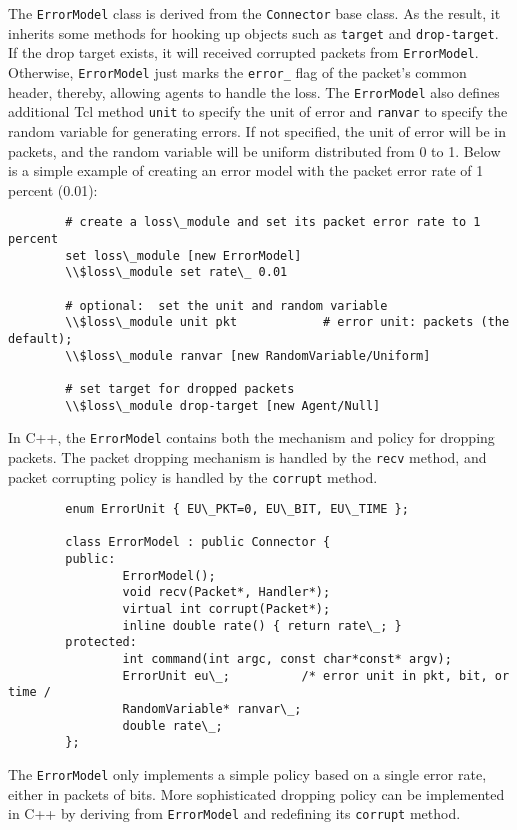 The {\tt ErrorModel} class is derived from the {\tt Connector} base
class.  As the result, it inherits some methods for hooking up objects
such as {\tt target} and {\tt drop-target}.  If the drop target
exists, it will received corrupted packets from {\tt ErrorModel}.
Otherwise, {\tt ErrorModel} just marks the {\tt error\_} flag of the
packet's common header, thereby, allowing agents to handle the loss.
The {\tt ErrorModel} also defines additional Tcl method {\tt unit} to
specify the unit of error and {\tt ranvar} to specify the random
variable for generating errors.  If not specified, the unit of error
will be in packets, and the random variable will be uniform distributed
from 0 to 1.  Below is a simple example of creating an error model with
the packet error rate of 1 percent (0.01):
\begin{verbatim}
        # create a loss\_module and set its packet error rate to 1 percent
        set loss\_module [new ErrorModel]
        \\$loss\_module set rate\_ 0.01

        # optional:  set the unit and random variable
        \\$loss\_module unit pkt            # error unit: packets (the default);
        \\$loss\_module ranvar [new RandomVariable/Uniform]

        # set target for dropped packets
        \\$loss\_module drop-target [new Agent/Null]
\end{verbatim}

In C++, the {\tt ErrorModel} contains both the mechanism and policy for
dropping packets.  The packet dropping mechanism is handled by the
{\tt recv} method, and packet corrupting policy is handled by the
{\tt corrupt} method.
\begin{verbatim}
        enum ErrorUnit { EU\_PKT=0, EU\_BIT, EU\_TIME };

        class ErrorModel : public Connector {
        public:
                ErrorModel();
                void recv(Packet*, Handler*);
                virtual int corrupt(Packet*);
                inline double rate() { return rate\_; }
        protected:
                int command(int argc, const char*const* argv);
                ErrorUnit eu\_;          /* error unit in pkt, bit, or time /
                RandomVariable* ranvar\_;
                double rate\_;
        };
\end{verbatim}
The {\tt ErrorModel} only implements a simple policy based on a single
error rate, either in packets of bits.  More sophisticated dropping
policy can be implemented in C++ by deriving from {\tt ErrorModel} and
redefining its {\tt corrupt} method.


